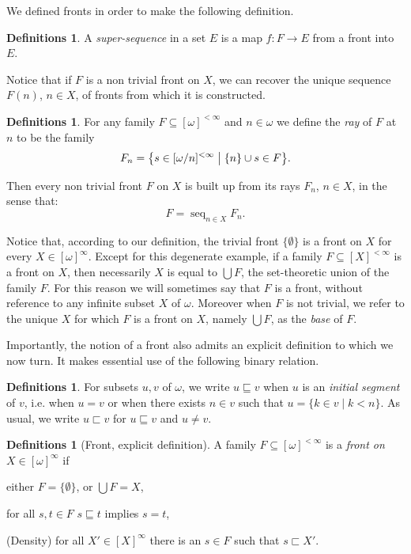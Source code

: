 \documentclass{article}%
\theoremstyle{plain}
\theoremstyle{definition}
\newtheorem{definition}[theorem]{Definition}
\newtheorem{definition}[theorem]{Notation}
\newtheorem{definition}[theorem]{Notations}
\newtheorem{definition}[theorem]{Definitions}
\theoremstyle{remark}
\DeclareMathOperator*{\Seq}{\mathrm{seq}}
\DeclareMathOperator{\base}{\mathord{\bigcup}}
\newcommand{\segm} {\sqsubseteq}
\newcommand{\segs} {\sqsubset}
\newcommand{\finSub}[1] {[#1]^{<\infty}}
\newcommand{\infSub}[1]{[#1]^{\infty}}
\begin{document}
We defined fronts in order to make the following definition.
\begin{definition}
A \emph{super-sequence} in a set $E$ is a map $f:F\to E$ from a front into $E$.
\end{definition}


Notice that if $F$ is a non trivial front on $X$, we can recover the unique sequence $F(n)$, $n\in X$, of fronts from which it is constructed. 
\begin{definition}
For any family $F\subseteq \finSub{\omega}$ and $n\in\omega$ we define the \emph{ray} of $F$ at $n$ to be the family
\[
F_{n}=\bigl\{s\in\finSub{\omega/n}\bigm\vert \{n\}\cup s\in F\bigr\}.
\]
\end{definition}

Then every non trivial front $F$ on $X$ is built up from its rays $F_{n}$, $n\in X$, in the sense that:
\[
F=\Seq_{n\in X}F_{n}.
\]

Notice that, according to our definition, the trivial front $\{\emptyset\}$ is a front on $X$ for every $X\in\infSub{\omega}$. Except for this degenerate example, if a family $F\subseteq \finSub{X}$ is a front on $X$, then necessarily $X$ is equal to $\base F$, the set-theoretic union of the family $F$. For this reason we will sometimes say that $F$ is a front, without reference to any infinite subset $X$ of $\omega$. Moreover when $F$ is not trivial, we refer to the unique $X$ for which $F$ is a front on $X$, namely $\base F$, as the \emph{base} of $F$. 



Importantly, the notion of a front also admits an explicit definition to which we now turn. It makes essential use of the following binary relation.

\begin{definition}
For subsets $u,v$ of $\omega$, we write $u\segm v$ when $u$ is an \emph{initial segment} of $v$, i.e. when $u=v$ or when there exists $n\in v$ such that $u=\{k\in v\mid k<n\}$. As usual, we write $u\segs v$ for $u\segm v$ and $u\neq v$. 
\end{definition}
 

\begin{definition}[Front, explicit definition]
A family $F\subseteq\finSub{\omega}$ is a \emph{front on} $X\in \infSub{\omega}$ if 
\begin{enumDefn}
\item either $F=\{\emptyset\}$, or $\base F=X$,\label{def Front1}
\item for all $s,t\in F$ $s\segm t$ implies $s=t$, \label{def Front2}
\item (Density) for all $X'\in\infSub{X}$ there is an $s\in F$ such that $s\segs X'$. \label{def Front3}
\end{enumDefn}
\end{definition}
\end{document}
